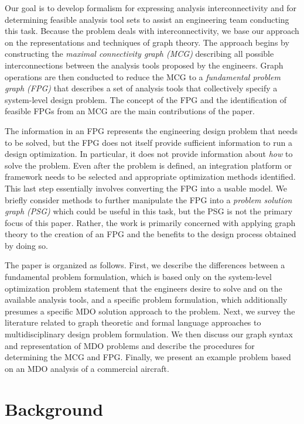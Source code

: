     Our goal is to develop formalism for expressing analysis interconnectivity and for determining feasible
    analysis tool sets to assist an engineering team conducting this task. Because the problem deals with
    interconnectivity, we base our approach on the representations and techniques of graph theory.
    The approach begins by constructing the \emph{maximal connectivity graph (MCG)} describing all possible
    interconnections between the analysis tools proposed by the engineers. Graph operations are then
    conducted to reduce the MCG to a \emph{fundamental problem graph (FPG)} that describes a set of analysis
    tools that collectively specify a system-level design problem. The concept of the FPG and the identification of feasible FPGs from an MCG are the main contributions of the paper.

    The information in an FPG represents the engineering design problem that needs to be solved, but the FPG does not 
    itself provide sufficient information to run a design optimization. In particular, it does not provide information 
    about \textit{how} to solve the problem. Even after the problem is defined, an integration platform or framework needs 
    to be selected and appropriate optimization methods identified. This last step essentially 
    involves converting the FPG into a usable model. We briefly consider methods to further 
    manipulate the FPG into a \emph{problem solution graph (PSG)} which could be useful in this 
    task, but the PSG is not the primary focus of this paper. Rather, the work is primarily concerned with applying graph 
    theory to the creation of an FPG and the benefits to the design process obtained by doing so. 
    
    The paper is organized as follows. First, we describe the differences between a fundamental problem
    formulation, which is based only on the system-level optimization problem statement that the
    engineers desire to solve and on the available analysis tools, and a specific problem formulation, which
    additionally presumes a specific MDO solution approach to the problem. Next, we survey the literature related to
    graph theoretic and formal language approaches to multidisciplinary design problem formulation. 
    We then discuss our graph syntax and representation of MDO problems and describe the procedures for 
    determining the MCG and FPG. Finally, we present an example problem based on an MDO analysis of a 
    commercial aircraft.

\section{Background}
